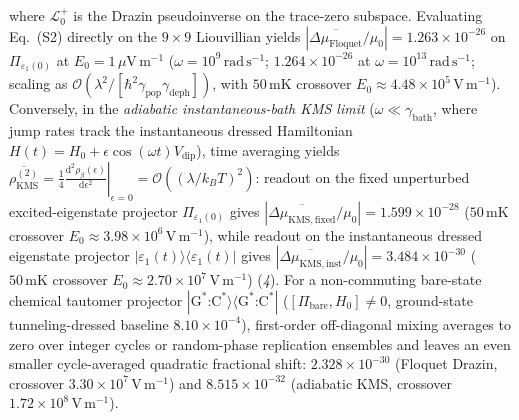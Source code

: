 \documentclass[10pt,letterpaper]{article}
\newcommand{\Lcal}{\mathcal{L}}
\begin{document}
where $\Lcal_0^+$ is the Drazin pseudoinverse on the trace-zero subspace. Evaluating Eq.~(S2) directly on the $9 \times 9$ Liouvillian yields $|\overline{\Delta\mu_{\mathrm{Floquet}}}/\mu_0| = 1.263 \times 10^{-26}$ on $\Pi_{\varepsilon_1(0)}$ at $E_0 = 1\,\mu\mathrm{V\,m^{-1}}$ ($\omega = 10^9\,\mathrm{rad\,s^{-1}}$; $1.264 \times 10^{-26}$ at $\omega = 10^{13}\,\mathrm{rad\,s^{-1}}$; scaling as $\mathcal{O}(\lambda^2 / [\hbar^2\gamma_{\mathrm{pop}}\gamma_{\mathrm{deph}}])$, with $50\,\mathrm{mK}$ crossover $E_0 \approx 4.48 \times 10^5\,\mathrm{V\,m^{-1}}$). Conversely, in the \emph{adiabatic instantaneous-bath KMS limit} ($\omega \ll \gamma_{\mathrm{bath}}$, where jump rates track the instantaneous dressed Hamiltonian $H(t) = H_0 + \epsilon\cos(\omega t)V_{\mathrm{dip}}$), time averaging yields $\overline{\rho^{(2)}_{\mathrm{KMS}}} = \frac{1}{4}\left.\frac{\mathrm{d}^2\rho_\beta(\epsilon)}{\mathrm{d}\epsilon^2}\right|_{\epsilon=0} = \mathcal{O}((\lambda / k_B T)^2)$: readout on the fixed unperturbed excited-eigenstate projector $\Pi_{\varepsilon_1(0)}$ gives $|\overline{\Delta\mu_{\mathrm{KMS,fixed}}}/\mu_0| = 1.599 \times 10^{-28}$ ($50\,\mathrm{mK}$ crossover $E_0 \approx 3.98 \times 10^6\,\mathrm{V\,m^{-1}}$), while readout on the instantaneous dressed eigenstate projector $|\varepsilon_1(t)\rangle\langle\varepsilon_1(t)|$ gives $|\overline{\Delta\mu_{\mathrm{KMS,inst}}}/\mu_0| = 3.484 \times 10^{-30}$ ($50\,\mathrm{mK}$ crossover $E_0 \approx 2.70 \times 10^7\,\mathrm{V\,m^{-1}}$) (\textit{4}). For a non-commuting bare-state chemical tautomer projector $|\mathrm{G}^*\text{:}\mathrm{C}^*\rangle\langle\mathrm{G}^*\text{:}\mathrm{C}^*|$ ($[\Pi_{\mathrm{bare}}, H_0] \neq 0$, ground-state tunneling-dressed baseline $8.10 \times 10^{-4}$), first-order off-diagonal mixing averages to zero over integer cycles or random-phase replication ensembles and leaves an even smaller cycle-averaged quadratic fractional shift: $2.328 \times 10^{-30}$ (Floquet Drazin, crossover $3.30 \times 10^7\,\mathrm{V\,m^{-1}}$) and $8.515 \times 10^{-32}$ (adiabatic KMS, crossover $1.72 \times 10^8\,\mathrm{V\,m^{-1}}$).
\end{document}
